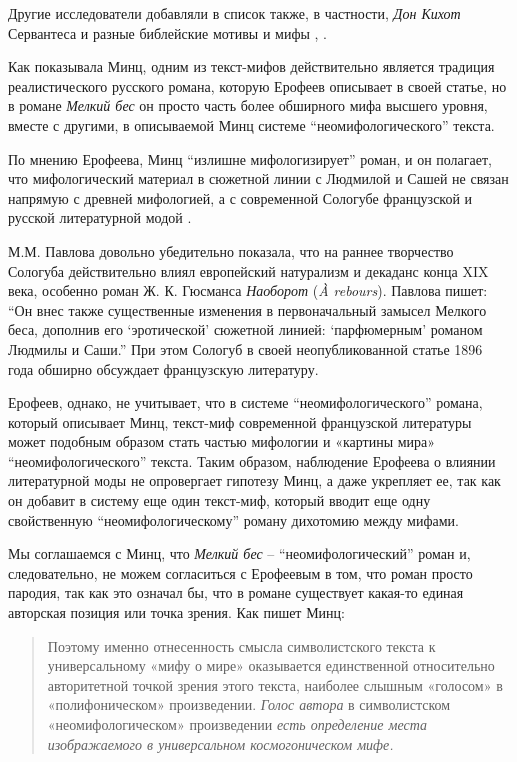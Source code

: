 \documentclass[12pt,a4paper]{article}
\begin{document}
Другие исследователи добавляли в список также, в частности, \emph{Дон Кихот} Сервантеса \parencite{bagno2009} и разные библейские мотивы и мифы \parencite{kobrinski2013}, \parencite[272]{silard1984}.



Как показывала Минц, одним из текст-мифов действительно является традиция реалистического русского романа, которую Ерофеев описывает в своей статье, но в романе \emph{Мелкий бес} он просто часть более обширного мифа высшего уровня, вместе с другими, в описываемой Минц системе \enquote{неомифологического} текста.


По мнению Ерофеева, Минц \enquote{излишне мифологизирует} роман, и он полагает, что мифологический материал в сюжетной линии с Людмилой и Сашей не связан напрямую с древней мифологией, а с современной Сологубе французской и русской литературной модой \parencite[152]{jerofeev1985}.

М.М. Павлова довольно убедительно показала, что на раннее творчество Сологуба действительно влиял европейский натурализм и декаданс конца XIX века, особенно роман Ж. К. Гюсманса \emph{Наоборот} (\emph{À rebours}). Павлова пишет: \enquote{Он внес также существенные изменения в первоначальный замысел \emph{}{Мелкого беса}, дополнив его \enquote{эротической} сюжетной линией: \enquote{парфюмерным} романом Людмилы и Саши.} \parencite[168.]{pavlova2007} При этом Сологуб в своей неопубликованной статье 1896 года  обширно обсуждает французскую литературу.

Ерофеев, однако, не учитывает, что в системе \enquote{неомифологического} романа, который описывает Минц, текст-миф современной французской литературы может подобным образом стать частью мифологии и «картины мира» \enquote{неомифологического} текста. Таким образом, наблюдение Ерофеева о влиянии литературной моды не опровергает гипотезу Минц, а даже укрепляет ее, так как он добавит в систему еще один текст-миф, который вводит еще одну свойственную \enquote{неомифологическому} роману дихотомию между мифами.

Мы соглашаемся с Минц, что \emph{Мелкий бес} -- \enquote{неомифологический} роман и, следовательно, не можем согласиться с Ерофеевым в том, что роман просто пародия, так как это означал бы, что в романе существует какая-то единая авторская позиция или точка зрения. Как пишет Минц:

\begin{quote}
Поэтому именно отнесенность смысла символистского текста к универсальному «мифу о мире» оказывается единственной относительно авторитетной точкой зрения этого текста, наиболее слышным «голосом» в «полифоническом» произведении. \emph{Голос автора} в символистском «неомифологическом» произведении \emph{есть определение места изображаемого в универсальном космогоническом мифе.}

\parencite[77.]{mints2004}
\end{quote}
\end{document}
